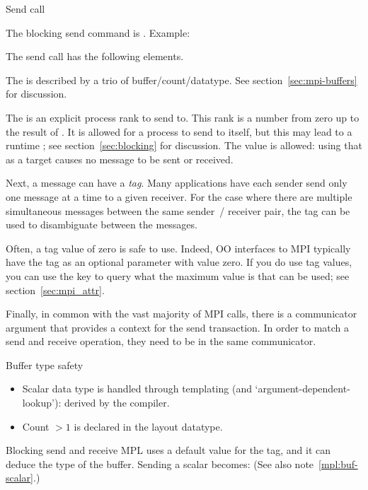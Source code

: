  {Send call}

The blocking send command is
%
.
%
Example:

The send call has the following elements.

The  is described by a trio of buffer/count/datatype.
See section~\ref{sec:mpi-buffers} for discussion.

The   is an
explicit process rank to send to.  This rank is a number from zero up
to the result of .
It is allowed for a process to send to itself, but
this may lead to a runtime ;
see section~\ref{sec:blocking} for discussion.
The value  is allowed:
using that as a target causes no message to be sent
or received.

Next, a message can have a
\emph{tag}.
Many applications have each sender send only one message at a time
to a given receiver.
For the case where there are
multiple simultaneous messages between the same sender~/ receiver pair,
the tag can be used to disambiguate between
the messages.

Often, a tag value of zero is safe to use.
Indeed, \ac{OO} interfaces to MPI typically have  the tag
as an optional parameter with value zero.
If you do
use tag values, you can use the key  to query
what the maximum value is that can be used; see
section~\ref{sec:mpi_attr}.

Finally, in common with the vast majority of MPI calls,
there is a communicator argument that provides a context for the send transaction.
In order to match a send and receive operation,
they need to be in the same communicator.

\begin{mplnote}{Buffer type safety}
  \begin{itemize}
  \item Scalar data type is handled through templating
    (and `argument-dependent-lookup'): derived by the compiler.
  \item Count $>1$ is declared in the layout datatype.
  \end{itemize}
\end{mplnote}

\begin{mplnote}{Blocking send and receive}
  \ac{MPL} uses a default value for the tag, and it can deduce the type
  of the buffer. Sending a scalar becomes:
  (See also note~\ref{mpl:buf-scalar}.)
\end{mplnote}

